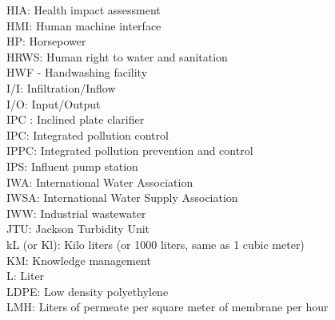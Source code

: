 HIA:  Health impact assessment
\vspace{0.3cm}\\
HMI:  Human machine interface  
\vspace{0.3cm}\\
HP:  Horsepower
\vspace{0.3cm}\\
HRWS: Human right to water and sanitation
\vspace{0.3cm}\\
HWF - Handwashing facility
\vspace{0.3cm}\\
I/I:  Infiltration/Inflow
\vspace{0.3cm}\\
I/O:  Input/Output
\vspace{0.3cm}\\
IPC :  Inclined plate clarifier
\vspace{0.3cm}\\
IPC:  Integrated pollution control
\vspace{0.3cm}\\
IPPC:  Integrated pollution prevention and control
\vspace{0.3cm}\\
IPS:  Influent pump station
\vspace{0.3cm}\\
IWA:  International Water Association
\vspace{0.3cm}\\
IWSA:  International Water Supply Association
\vspace{0.3cm}\\
IWW:  Industrial wastewater
\vspace{0.3cm}\\
JTU:  Jackson Turbidity Unit
\vspace{0.3cm}\\
kL (or Kl):  Kilo liters (or 1000 liters, same as 1 cubic meter)
\vspace{0.3cm}\\
KM:  Knowledge management
\vspace{0.3cm}\\
L:  Liter
\vspace{0.3cm}\\
LDPE:  Low density polyethylene
\vspace{0.3cm}\\
LMH:  Liters of permeate per square meter of membrane per hour
\vspace{0.3cm}\\
